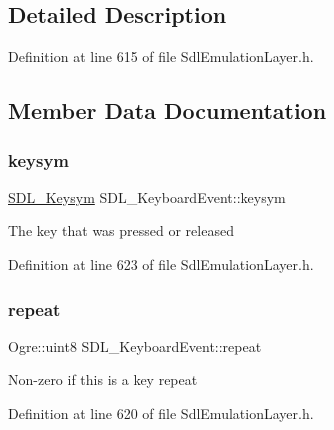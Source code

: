\subsection{Detailed Description}


Definition at line 615 of file Sdl\+Emulation\+Layer.\+h.



\subsection{Member Data Documentation}
\mbox{\label{struct_s_d_l___keyboard_event_a2a57ba820a298f2c02ad5d41fd2b1aa8}} 
\subsubsection{\texorpdfstring{keysym}{keysym}}
{\footnotesize\ttfamily \hyperlink{struct_s_d_l___keysym}{S\+D\+L\+\_\+\+Keysym} S\+D\+L\+\_\+\+Keyboard\+Event\+::keysym}

The key that was pressed or released 

Definition at line 623 of file Sdl\+Emulation\+Layer.\+h.

\mbox{\label{struct_s_d_l___keyboard_event_a242537ff16ce0a0039d664e4c4d1c40d}} 
\subsubsection{\texorpdfstring{repeat}{repeat}}
{\footnotesize\ttfamily Ogre\+::uint8 S\+D\+L\+\_\+\+Keyboard\+Event\+::repeat}

Non-\/zero if this is a key repeat 

Definition at line 620 of file Sdl\+Emulation\+Layer.\+h.

\mbox{\label{struct_s_d_l___keyboard_event_a54f998fe45b7da252c1aee14e0f80208}} 

